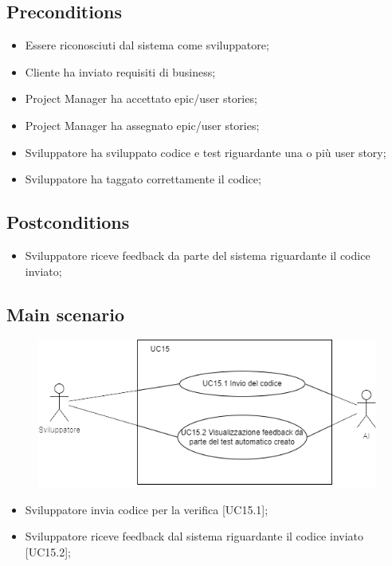 \documentclass{article}
\begin{document}
    \subsection*{Preconditions}
        \begin{itemize}
            \item Essere riconosciuti dal sistema come sviluppatore;
            \item Cliente ha inviato requisiti di business;
            \item Project Manager ha accettato epic/user stories;
            \item Project Manager ha assegnato epic/user stories;
            \item Sviluppatore ha sviluppato codice e test riguardante una o più user story;
            \item Sviluppatore ha taggato correttamente il codice;
        \end{itemize}
        
    \subsection*{Postconditions}
        \begin{itemize}
            \item Sviluppatore riceve feedback da parte del sistema riguardante il codice inviato;
        \end{itemize}
    
    \subsection*{Main scenario}
        \begin{figure}[h]
          \centering
          \includegraphics{documenti/imgUML/UC15-zoom.png}
          \label{fig:immagine}
        \end{figure}
        
        \begin{itemize}
            \item Sviluppatore invia codice per la verifica [UC15.1];

            \item Sviluppatore riceve feedback dal sistema riguardante il codice inviato [UC15.2];
        \end{itemize}
        
\end{document}
